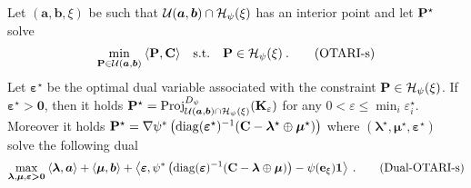 \begin{proposition}
    Let $(\bm{a}, \bm{b}, \xi)$ be such that ${\mathcal{U}}(\bm{a}, \bm{b}) \cap \mathcal{H}_\psi(\xi)$ has an interior point and let ${\mathbf{P}}^\star$ solve
    \begin{align}
      \min_{{\mathbf{P}} \in {\mathcal{U}}(\bm{a}, \bm{b})} \: \langle {\mathbf{P}}, {\mathbf{C}} \rangle \quad \text{s.t.} \quad  {\mathbf{P}} \in \mathcal{H}_\psi(\xi) \:.
      \tag{OTARI-s}
  \end{align}
  Let $\bm{\varepsilon}^\star$ be the optimal dual variable associated with the constraint ${\mathbf{P}} \in \mathcal{H}_\psi(\xi)$.
  If $\bm{\varepsilon}^\star \bm{>} \bm{0}$, then it holds ${\mathbf{P}}^\star = \operatorname{Proj}^{D_\psi}_{{\mathcal{U}}(\bm{a}, \bm{b}) \cap \mathcal{H}_\psi(\xi)}({\mathbf{K}}_\varepsilon)$ for any $0 < \varepsilon \leq \min_i{\varepsilon_i^\star}$. Moreover it holds ${\mathbf{P}}^\star = \nabla \psi^* \left(\operatorname{diag}(\bm{\varepsilon}^\star)^{-1} ({\mathbf{C}} - \bm{\lambda}^\star \oplus \bm{\mu}^\star) \right)$ where $(\bm{\lambda}^\star, \bm{\mu}^\star, \bm{\varepsilon}^\star)$ solve the following dual
  \begin{align}
    \max_{\bm{\lambda}, \bm{\mu}, \bm{\varepsilon} \bm{>} \bm{0}} \: \langle \bm{\lambda}, \bm{a} \rangle + \langle \bm{\mu}, \bm{b} \rangle + \left\langle \bm{\varepsilon}, \psi^*\left(\operatorname{diag}(\bm{\varepsilon})^{-1} ({\mathbf{C}} - \bm{\lambda} \oplus \bm{\mu}) \right) - \psi(\mathbf{e}_\xi) \bm{1}  \right\rangle \:.
    \tag{Dual-OTARI-s}
  \end{align}
\end{proposition}

